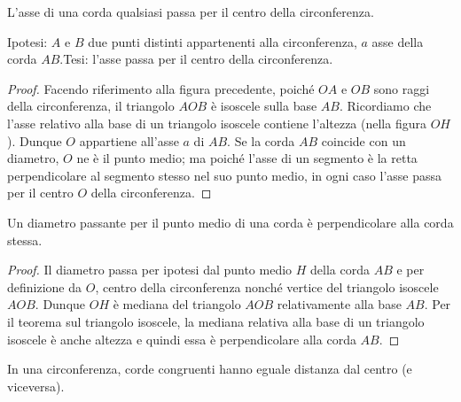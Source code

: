 \begin{teorema}
L'asse di una corda qualsiasi passa per il centro della circonferenza.
\end{teorema}

\noindent Ipotesi: \(A\) e \(B\) due punti distinti appartenenti alla 
circonferenza, \(a\) asse della corda \(AB\).\tab Tesi: l'asse passa per 
il centro della circonferenza.

\begin{proof}
Facendo riferimento alla figura precedente, poiché \(OA\) e \(OB\) sono 
raggi della circonferenza, il triangolo \(AOB\) è isoscele sulla base 
\(AB\). Ricordiamo che l'asse relativo alla base di un triangolo 
isoscele contiene l'altezza (nella figura \(OH\)). Dunque \(O\) 
appartiene all'asse \(a\) di \(AB\).
Se la corda \(AB\) coincide con un diametro, \(O\) ne è il punto medio; 
ma poiché l'asse di un segmento è la retta perpendicolare al segmento 
stesso nel suo punto medio, in ogni caso l'asse passa per il centro 
\(O\) della circonferenza.
\end{proof}

\begin{teorema}
Un diametro passante per il punto medio di una corda è perpendicolare 
alla corda stessa.
\end{teorema}

\noindent\begin{minipage}{0.65\textwidth}\parindent15pt
\begin{proof}
Il diametro passa per ipotesi dal punto medio \(H\) della corda \(AB\) e 
per definizione da \(O\), centro della circonferenza nonché vertice del 
triangolo isoscele \(AOB\). Dunque \(OH\) è mediana del triangolo \(AOB\) 
relativamente alla base \(AB\). Per il teorema sul triangolo isoscele, 
la mediana relativa alla base di un triangolo isoscele è anche 
altezza e quindi essa è perpendicolare alla corda \(AB\).
\end{proof}
\end{minipage}\hfil
\begin{minipage}{0.35\textwidth}
  \centering
\end{minipage}

\begin{teorema}
In una circonferenza, corde congruenti hanno eguale distanza dal 
centro (e viceversa).
\end{teorema}

